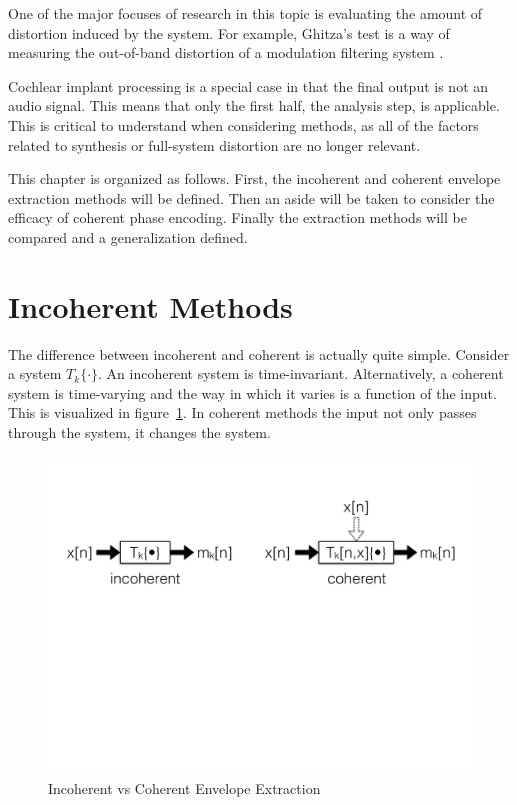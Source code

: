 \documentclass [11pt, proquest,oneside] {ganter_thesis}[2015/03/03]
\begin{document}
One of the major focuses of research in this topic is evaluating the amount of distortion induced by the system.  For example, Ghitza's test is a way of measuring the out-of-band distortion of a modulation filtering system \cite{ghitza2001upper}.

Cochlear implant processing is a special case in that the final output is not an audio signal.  This means that only the first half, the analysis step, is applicable.  This is critical to understand when considering methods, as all of the factors related to synthesis or full-system distortion are no longer relevant.

This chapter is organized as follows.  First, the incoherent and coherent envelope extraction methods will be defined.  Then an aside will be taken to consider the efficacy of coherent phase encoding.  Finally the extraction methods will be compared and a generalization defined.

\section{Incoherent Methods}

The difference between incoherent and coherent is actually quite simple.  Consider a system $T_k\{\cdot\}$.  An incoherent system is time-invariant.  Alternatively, a coherent system is time-varying and the way in which it varies is a function of the input.  This is visualized in figure~\ref{fig:incoherent_vs_coherent}.  In coherent methods the input not only passes through the system, it changes the system.

\begin{figure}[!ht]
  \centering
    \includegraphics[width=1\textwidth]{incoherent_vs_coherent}   
    \caption{Incoherent vs Coherent Envelope Extraction}\label{fig:incoherent_vs_coherent}
\end{figure}
\end{document}
